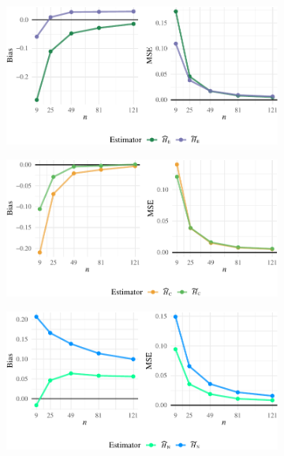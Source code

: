 \begin{figure}[H]
	\begin{subfigure}[t]{0.48\textwidth}
    \centering
    \includegraphics[width=\textwidth]{../../Figures/PDF/Plot_bias_mse_Ebrahimi-1}
    \caption{}
    \label{fig:subfig3}
  \end{subfigure}
  \hfill
  \begin{subfigure}[t]{0.48\textwidth}
    \centering
    \includegraphics[width=\textwidth]{../../Figures/PDF/Plot_bias_mse_correa-1}
    \caption{}
    \label{fig:subfig4}
  \end{subfigure}
	\begin{subfigure}[t]{0.48\textwidth}
    \centering
    \includegraphics[width=\textwidth]{../../Figures/PDF/Plot_bias_mse_noughabi-1}

\end{subfigure}
\end{figure}

